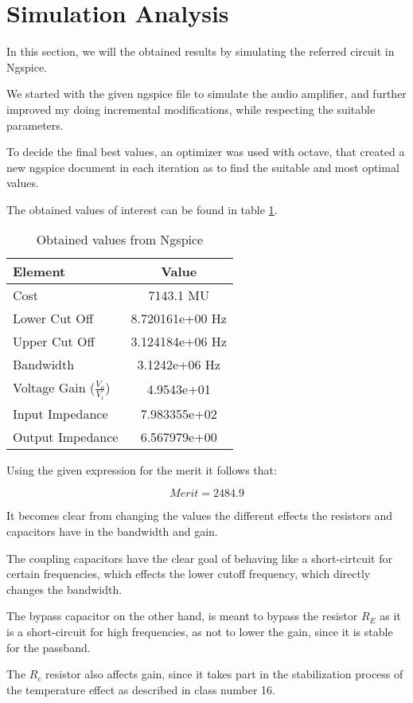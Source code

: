 \newpage

\section{Simulation Analysis}
\label{sec:simulation}

In this section, we will the obtained results by simulating the referred circuit in Ngspice. 

We started with the given ngspice file to simulate the audio amplifier, and further improved my doing incremental modifications, while respecting the suitable parameters.

To decide the final best values, an optimizer was used with octave, that created a new ngspice document in each iteration as to find the suitable and most optimal values.

The obtained values of interest can be found in table \ref{tab:sim1}.

\begin{table}[h]
    \centering
    \begin{tabular}{|l|c|}
    \hline
    {\bf Element } & {\bf Value} \\
    \hline \hline
    Cost & 7143.1 MU\\
    \hline
    Lower Cut Off & 8.720161e+00 Hz\\
    \hline
    Upper Cut Off & 3.124184e+06 Hz \\
    \hline
    Bandwidth & 3.1242e+06 Hz \\
    \hline
    Voltage Gain ($\frac{V_{o}}{V_{i}}$)  &  4.9543e+01 \\
    \hline
    Input Impedance & 7.983355e+02 \\
    \hline
    Output Impedance & 6.567979e+00 \\
    \hline 
    \end{tabular}
    \caption{Obtained values from Ngspice}
    \label{tab:sim1}
\end{table}


Using the given expression for the merit it follows that:

\begin{equation}
    Merit = 2484.9
    \label{eq:merit}
\end{equation}

It becomes clear from changing the values the different effects the resistors and capacitors have in the bandwidth and gain.

The coupling capacitors have the clear goal of behaving like a short-cirtcuit for certain frequencies, which effects the lower cutoff frequency, which directly changes the bandwidth.

The bypass capacitor on the other hand, is meant to bypass the resistor $R_E$ as it is a short-circuit for high frequencies, as not to lower the gain, since it is stable for the passband.

The $R_c$ resistor also affects gain, since it takes part in the stabilization process of the temperature effect as described in class number 16.





